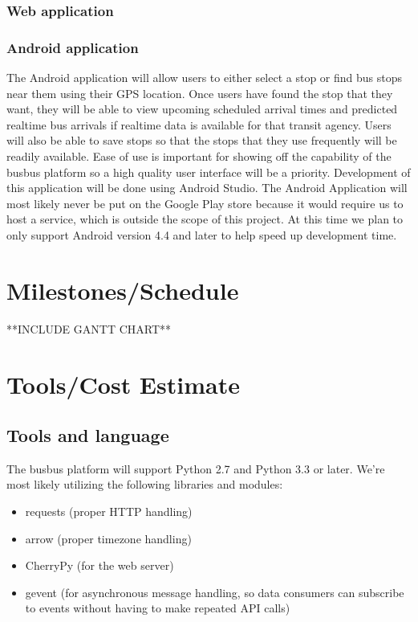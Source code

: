 \documentclass[12pt]{article}
\begin{document}
\subsubsection{Web application}

\subsubsection{Android application}
The Android application will allow users to either select a stop or find bus stops near them using their GPS location.
Once users have found the stop that they want, they will be able to view upcoming scheduled arrival times and
predicted realtime bus arrivals if realtime data is available for that transit agency. Users will also be able
to save stops so that the stops that they use frequently will be readily available. Ease of use is important
for showing off the capability of the busbus platform so a high quality user interface will be a priority.
Development of this application will be done using Android Studio. The Android Application will most likely never
be put on the Google Play store because it would require us to host a service, which is outside the scope of this
project. At this time we plan to only support Android version 4.4 and later to help speed up development time.

\section{Milestones/Schedule}
**INCLUDE GANTT CHART**

\section{Tools/Cost Estimate}
\subsection{Tools and language}
The busbus platform will support Python 2.7 and Python 3.3 or later. We're most likely utilizing the following
libraries and modules:
\begin{itemize}
\item requests (proper HTTP handling)
\item arrow (proper timezone handling)
\item CherryPy (for the web server)
\item gevent (for asynchronous message handling, so data consumers can subscribe to events
without having to make repeated API calls)
\end{itemize}
\end{document}
